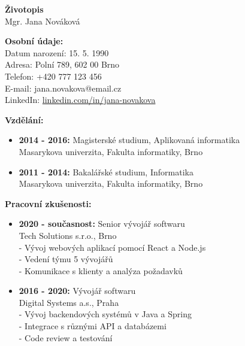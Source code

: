 \documentclass[a4paper,11pt]{article}
\begin{document}
\begin{center}
    {\LARGE \textbf{Životopis}} \\
    \vspace{0.5cm}
    {\Large Mgr. Jana Nováková} \\
\end{center}

\vspace{0.5cm}

\textbf{Osobní údaje:} \\
Datum narození: 15. 5. 1990 \\
Adresa: Polní 789, 602 00 Brno \\
Telefon: +420 777 123 456 \\
E-mail: jana.novakova@email.cz \\
LinkedIn: \url{linkedin.com/in/jana-novakova} \\

\vspace{0.5cm}

\textbf{Vzdělání:} \\
\begin{itemize}[leftmargin=*]
    \item \textbf{2014 - 2016:} Magisterské studium, Aplikovaná informatika \\
    Masarykova univerzita, Fakulta informatiky, Brno
    
    \item \textbf{2011 - 2014:} Bakalářské studium, Informatika \\
    Masarykova univerzita, Fakulta informatiky, Brno
\end{itemize}

\vspace{0.5cm}

\textbf{Pracovní zkušenosti:} \\
\begin{itemize}[leftmargin=*]
    \item \textbf{2020 - současnost:} Senior vývojář softwaru \\
    Tech Solutions s.r.o., Brno \\
    - Vývoj webových aplikací pomocí React a Node.js \\
    - Vedení týmu 5 vývojářů \\
    - Komunikace s klienty a analýza požadavků
    
    \item \textbf{2016 - 2020:} Vývojář softwaru \\
    Digital Systems a.s., Praha \\
    - Vývoj backendových systémů v Java a Spring \\
    - Integrace s různými API a databázemi \\
    - Code review a testování
\end{itemize}
\end{document}
